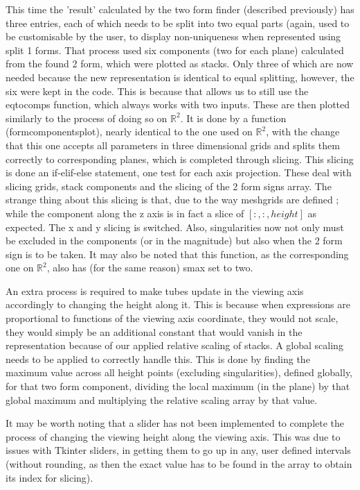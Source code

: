 \documentclass[12pt]{report}
\begin{document}
This time the 'result' calculated by the two form finder (described previously) has three entries, each of which needs to be split into two equal parts (again, used to be customisable by the user, to display non-uniqueness when represented using split 1 forms. That process used six components (two for each plane) calculated from the found 2 form, which were plotted as stacks. Only three of which are now needed because the new representation is identical to equal splitting, however, the six were kept in the code. This is because that allows us to still use the eq\textunderscore to\textunderscore comps function, which always works with two inputs. These are then plotted similarly to the process of doing so on $\mathbb{R}^{2}$. It is done by a function (form\textunderscore components\textunderscore plot), nearly identical to the one used on $\mathbb{R}^{2}$, with the change that this one accepts all parameters in three dimensional grids and splits them correctly to corresponding planes, which is completed through slicing.
This slicing is done an if-elif-else statement, one test for each axis projection. These deal with slicing grids, stack components and the slicing of the 2 form signs array.
The strange thing about this slicing is that, due to the way meshgrids are defined ; while the component along the z axis is in fact a slice of $[:, :, height]$ as expected. The x and y slicing is switched.
Also, singularities now not only must be excluded in the components (or in the magnitude) but also when the 2 form sign is to be taken.
It may also be noted that this function, as the corresponding one on $\mathbb{R}^{2}$, also has (for the same reason) s\textunderscore max set to two.

\noindent An extra process is required to make tubes update in the viewing axis accordingly to changing the height along it. This is because when expressions are proportional to functions of the viewing axis coordinate, they would not scale, they would simply be an additional constant that would vanish in the representation because of our applied relative scaling of stacks. A global scaling needs to be applied to correctly handle this.
This is done by finding the maximum value across all height points (excluding singularities), defined globally, for that two form component, dividing the local maximum (in the plane) by that global maximum and multiplying the relative scaling array by that value.

It may be worth noting that a slider has not been implemented to complete the process of changing the viewing height along the viewing axis. This was  due to issues with Tkinter sliders, in getting them to go up in any, user defined intervals (without rounding, as then the exact value has to be found in the array to obtain its index for slicing).
\end{document}
